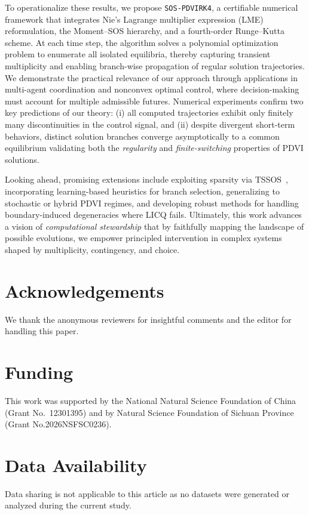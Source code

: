 \documentclass[sn-basic,Numbered]{sn-jnl}
\theoremstyle{thmstyleone}%
\begin{document}
To operationalize these results, we propose \texttt{SOS-PDVIRK4}, a certifiable numerical framework that integrates Nie’s Lagrange multiplier expression (LME) reformulation, the Moment–SOS hierarchy, and a fourth-order Runge–Kutta scheme. At each time step, the algorithm solves a polynomial optimization problem to enumerate all isolated equilibria, thereby capturing transient multiplicity and enabling branch-wise propagation of regular solution trajectories.
We demonstrate the practical relevance of our approach through applications in multi-agent coordination and nonconvex optimal control, where decision-making must account for multiple admissible futures. Numerical experiments confirm two key predictions of our theory: (i) all computed trajectories exhibit only finitely many discontinuities in the control signal, and (ii) despite divergent short-term behaviors, distinct solution branches converge asymptotically to a common equilibrium validating both the \emph{regularity} and \emph{finite-switching} properties of PDVI solutions.

Looking ahead, promising extensions include exploiting sparsity via TSSOS~\cite{Wang2021,Wang2023}, incorporating learning-based heuristics for branch selection, generalizing to stochastic or hybrid PDVI regimes, and developing robust methods for handling boundary-induced degeneracies where LICQ fails. Ultimately, this work advances a vision of \emph{computational stewardship} that by faithfully mapping the landscape of possible evolutions, we empower principled intervention in complex systems shaped by multiplicity, contingency, and choice.



\section*{Acknowledgements}
We thank the anonymous reviewers for insightful comments and the editor for handling
this paper.

\section*{Funding}
This work was supported by the National Natural Science Foundation of China (Grant No.~12301395) and by Natural Science Foundation of Sichuan Province (Grant No.2026NSFSC0236).


\section*{Data Availability} 
Data sharing is not applicable to this article as no datasets were generated or analyzed during the current study.
\end{document}

